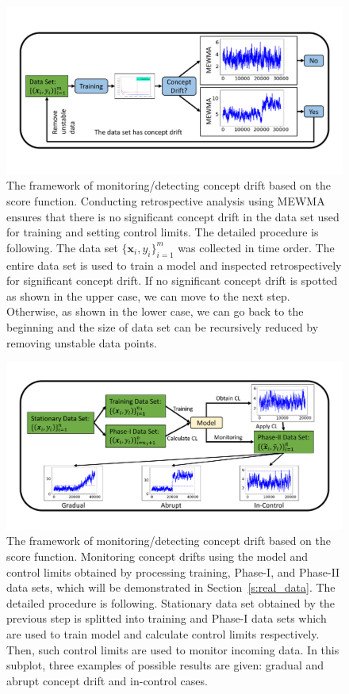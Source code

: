 \documentclass[twoside,11pt]{article}
\begin{document}
\begin{figure}[!htbp]
\centering
\includegraphics[width = 1\linewidth, trim=.35in .69in .35in .69in, clip]{../figures/v14/flow_chart/Retrospective_1.png}
\caption{The framework of monitoring/detecting concept drift based on the score function. Conducting retrospective analysis using MEWMA ensures that there is no significant concept drift in the data set used for training and setting control limits. The detailed procedure is following. The data set $\{\bm{x}_i, y_i\}_{i=1}^m$ was collected in time order. The entire data set is used to train a model and inspected retrospectively for significant concept drift. If no significant concept drift is spotted as shown in the upper case, we can move to the next step. Otherwise, as shown in the lower case, we can go back to the beginning and the size of data set can be recursively reduced by removing unstable data points.}
  \label{fig:proc_mon_score_retro}
\end{figure}

\begin{figure}
\centering
\includegraphics[width = 1\linewidth, trim=.35in .49in .35in .49in, clip]{../figures/v14/flow_chart/Monitoring_1.png}
\caption{The framework of monitoring/detecting concept drift based on the score function. Monitoring concept drifts using the model and control limits obtained by processing training, Phase-I, and Phase-II data sets, which will be demonstrated in Section~\ref{s:real_data}. The detailed procedure is following. Stationary data set obtained by the previous step is splitted into training and Phase-I data sets which are used to train model and calculate control limits respectively. Then, such control limits are used to monitor incoming data. In this subplot, three examples of possible results are given: gradual and abrupt concept drift and in-control cases.}
\label{fig:proc_mon_score_monitoring}
\end{figure}
\end{document}
